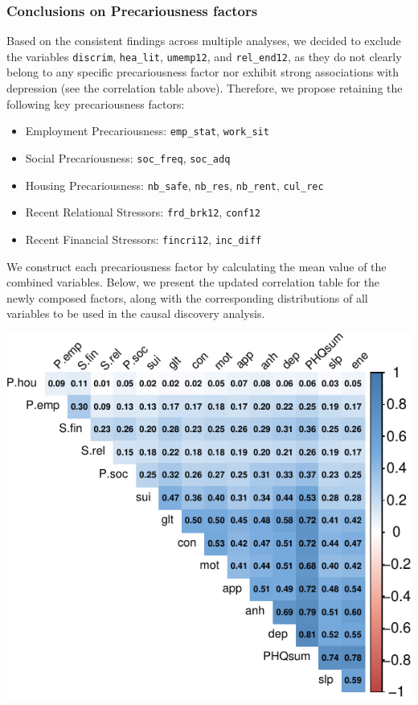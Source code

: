 \documentclass[
]{article}
\providecommand{\tightlist}{%
  \setlength{\itemsep}{0pt}\setlength{\parskip}{0pt}}\usepackage{longtable,booktabs,array}
\begin{document}
\subsubsection{Conclusions on Precariousness
factors}\label{conclusions-on-precariousness-factors}

Based on the consistent findings across multiple analyses, we decided to
exclude the variables \texttt{discrim}, \texttt{hea\_lit},
\texttt{umemp12}, and \texttt{rel\_end12}, as they do not clearly belong
to any specific precariousness factor nor exhibit strong associations
with depression (see the correlation table above). Therefore, we propose
retaining the following key precariousness factors:

\begin{itemize}
\tightlist
\item
  Employment Precariousness: \texttt{emp\_stat}, \texttt{work\_sit}
\item
  Social Precariousness: \texttt{soc\_freq}, \texttt{soc\_adq}
\item
  Housing Precariousness: \texttt{nb\_safe}, \texttt{nb\_res},
  \texttt{nb\_rent}, \texttt{cul\_rec}
\item
  Recent Relational Stressors: \texttt{frd\_brk12}, \texttt{conf12}
\item
  Recent Financial Stressors: \texttt{fincri12}, \texttt{inc\_diff}
\end{itemize}

We construct each precariousness factor by calculating the mean value of
the combined variables. Below, we present the updated correlation table
for the newly composed factors, along with the corresponding
distributions of all variables to be used in the causal discovery
analysis.

\begin{center}
\includegraphics{draft_v3_files/figure-pdf/unnamed-chunk-21-1.pdf}
\end{center}
\end{document}

